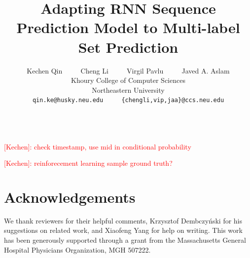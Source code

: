 \documentclass[11pt,a4paper]{article}
\title{Adapting RNN Sequence Prediction Model to Multi-label Set Prediction}
\author{Kechen Qin ~~~~ Cheng Li ~~~~ Virgil Pavlu ~~~~ Javed A. Aslam\\
  Khoury College of Computer Sciences \\
  Northeastern University\\
{\tt qin.ke@husky.neu.edu} ~~~~ {\tt \{chengli,vip,jaa\}@ccs.neu.edu}\\
   \\}
\date{}
\newcommand{\kechen}[1]{\textcolor{red}{[Kechen]: {#1}}}
\begin{document}
\maketitle
\begin{abstract}

\end{abstract}

\kechen{check timestamp, use mid in conditional probability}


\kechen{reinforecement learning sample ground truth?}
% 







\section{Acknowledgements}
We thank reviewers for their helpful comments, 
Krzysztof Dembczyński for his suggestions on related work, and
Xiaofeng Yang for help on writing. This work
has been generously supported through a grant from the
Massachusetts General Hospital Physicians Organization,
MGH 507222.
% 
\clearpage
\newpage




\appendix
\end{document}
